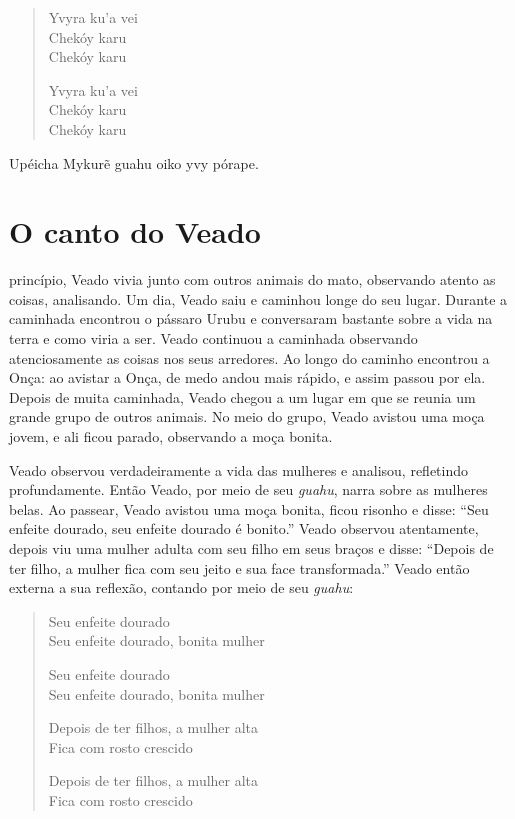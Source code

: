 \begin{verse}
Yvyra ku'a vei\\
Chekóy karu\\
Chekóy karu

Yvyra ku'a vei\\
Chekóy karu\\
Chekóy karu
\end{verse}
Upéicha Mykurẽ guahu oiko yvy pórape.


\chapter{O canto do Veado}

 princípio, Veado vivia junto com outros animais do mato, observando
atento as coisas, analisando. Um dia, Veado saiu e caminhou longe do seu
lugar. Durante a caminhada encontrou o pássaro Urubu e conversaram
bastante sobre a vida na terra e como viria a ser. Veado continuou a
caminhada observando atenciosamente as coisas nos seus arredores. Ao
longo do caminho encontrou a Onça: ao avistar a Onça, de medo andou mais
rápido, e assim passou por ela. Depois de muita caminhada, Veado chegou
a um lugar em que se reunia um grande grupo de outros animais. No meio
do grupo, Veado avistou uma moça jovem, e ali ficou parado, observando a
moça bonita.

Veado observou verdadeiramente a vida das mulheres e analisou,
refletindo profundamente. Então Veado, por meio de seu \textit{guahu},
narra sobre as mulheres belas. Ao passear, Veado avistou uma moça
bonita, ficou risonho e disse: ``Seu enfeite dourado, seu enfeite
dourado é bonito.'' Veado observou atentamente, depois viu uma mulher
adulta com seu filho em seus braços e disse: ``Depois de ter filho, a
mulher fica com seu jeito e sua face transformada.'' Veado então externa
a sua reflexão, contando por meio de seu \textit{guahu}:

\begin{verse}
Seu enfeite dourado\\
Seu enfeite dourado, bonita mulher

Seu enfeite dourado\\
Seu enfeite dourado, bonita mulher

\pagebreak
Depois de ter filhos, a mulher alta\\
Fica com rosto crescido

Depois de ter filhos, a mulher alta\\
Fica com rosto crescido
\end{verse}

